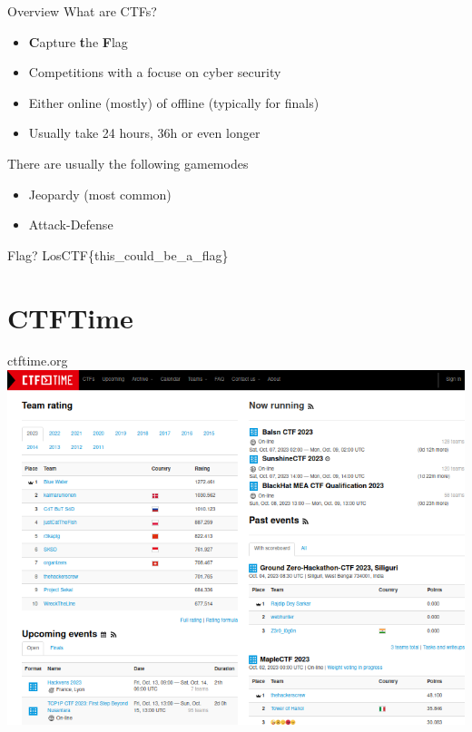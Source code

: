 \documentclass[12pt]{beamer}
\begin{document}
\begin{frame}{Overview}
    What are CTFs?
    \begin{itemize}
        \item {\bf C}apture {\bf t}he {\bf F}lag
        \item Competitions with a focuse on cyber security
        \item Either online (mostly) of offline (typically for finals)
        \item Usually take 24 hours, 36h or even longer
    \end{itemize}
    There are usually the following gamemodes
    \begin{itemize}
        \item Jeopardy (most common)
        \item Attack-Defense
    \end{itemize}
\end{frame}

\begin{frame}{Flag?}
    \huge{LosCTF\{this\_could\_be\_a\_flag\}}
\end{frame}


\section{CTFTime}
\begin{frame}{ctftime.org}
    \centering
    \includegraphics[width=0.8\columnwidth]{images/CTFTimeStartpage.png}
\end{frame}
\end{document}
